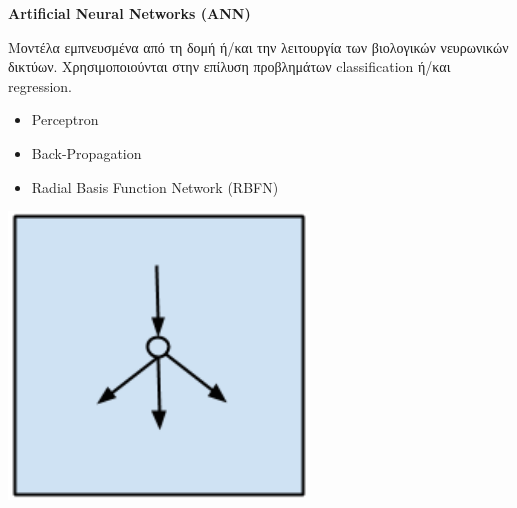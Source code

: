 \begin{minipage}{0.5\textwidth}

  \textbf{\large Artificial Neural Networks (ANN)}

  Μοντέλα εμπνευσμένα από τη δομή ή/και την λειτουργία των βιολογικών νευρωνικών δικτύων.
  Χρησιμοποιούνται στην επίλυση προβλημάτων classification ή/και regression.
  \begin{itemize}
    \setlength\itemsep{0em}
    \item{Perceptron}
    \item{Back-Propagation}
    \item{Radial Basis Function Network (RBFN)}
  \end{itemize}
\end{minipage}
\begin{minipage}{0.5\textwidth}
  \begin{center}
    \includegraphics[width=0.6\textwidth]{./images/chapter3/artificial_neural_network_algorithms.png}
  \end{center}
\end{minipage}

